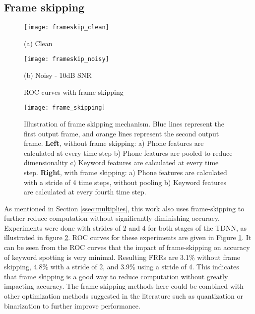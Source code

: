 \documentclass{article}
\begin{document}
\subsection{Frame skipping}
\label{ssec:result_frameskipping}

\begin{figure}[t]
\begin{minipage}[b]{\linewidth}
  \centering
  \centerline{\texttt{[image: frameskip\_clean]}}
\centerline{(a) Clean}\medskip
\end{minipage}
\hfill
\begin{minipage}[b]{\linewidth}
  \centering
  \centerline{\texttt{[image: frameskip\_noisy]}}
  \centerline{(b) Noisy - 10dB SNR}\medskip
\end{minipage}
\caption{ROC curves with frame skipping}
\label{fig:res_frameskip}
\end{figure}


\begin{figure}[H]
	\centering
	\texttt{[image: frame\_skipping]}
	\caption{Illustration of frame skipping mechanism.  Blue lines represent the first output frame, and orange lines represent the second output frame.  \textbf{Left}, without frame skipping: a) Phone features are calculated at every time step  b) Phone features are pooled to reduce dimensionality  c) Keyword features are calculated at every time step.  \textbf{Right}, with frame skipping: a) Phone features are calculated with a stride of 4 time steps, without pooling  b) Keyword features are calculated at every fourth time step. }
	\label{fig:frame_skipping}
\end{figure}

As mentioned in Section \ref{ssec:multiplies}, this work also uses frame-skipping to further reduce computation without significantly diminishing accuracy. Experiments were done with strides of 2 and 4 for both stages of the TDNN, as illustrated in figure \ref{fig:frame_skipping}. ROC curves for these experiments are given in Figure \ref{fig:res_frameskip}. It can be seen from the ROC curves that the impact of frame-skipping on accuracy of keyword spotting is very minimal. Resulting FRRs are 3.1\% without frame skipping, 4.8\% with a stride of 2, and 3.9\% using a stride of 4. This indicates that frame skipping is a good way to reduce computation without greatly impacting accuracy.  The frame skipping methods here could be combined with other optimization methods suggested in the literature such as quantization \cite{Lei13,Zhang17} or binarization \cite{Xiang17, Hubara16} to further improve performance.
\end{document}
